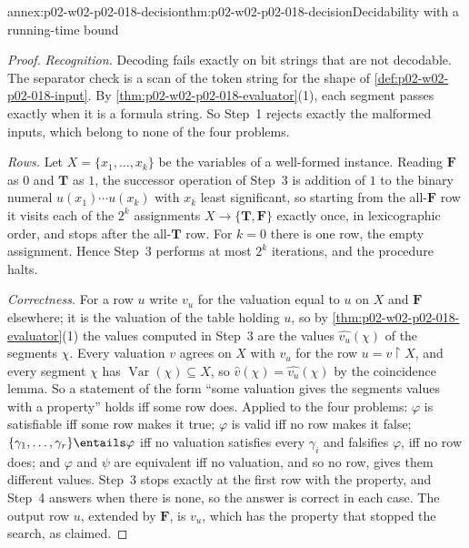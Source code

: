\begin{annexitem}{annex:p02-w02-p02-018-decision}{thm:p02-w02-p02-018-decision}{Decidability with a running-time bound}
\begin{proof}
\emph{Recognition.}  Decoding fails exactly on bit strings that are not
decodable.  The separator check is a scan of the token string for the shape of
\cref{def:p02-w02-p02-018-input}.  By
\cref{thm:p02-w02-p02-018-evaluator}(1), each segment passes exactly when it
is a formula string.  So Step~1 rejects exactly the malformed inputs, which
belong to none of the four problems.

\emph{Rows.}  Let \(X=\{x_1,\ldots,x_k\}\) be the variables of a well-formed
instance.  Reading \(\mathbf F\) as \(0\) and \(\mathbf T\) as \(1\), the
successor operation of Step~3 is addition of \(1\) to the binary numeral
\(u(x_1)\cdots u(x_k)\) with \(x_k\) least significant, so starting from the
all-\(\mathbf F\) row it visits each of the \(2^k\) assignments
\(X\to\{\mathbf T,\mathbf F\}\) exactly once, in lexicographic order, and
stops after the all-\(\mathbf T\) row.  For \(k=0\) there is one row, the
empty assignment.  Hence Step~3 performs at most \(2^k\) iterations, and the
procedure halts.

\emph{Correctness.}  For a row \(u\) write \(v_u\) for the valuation equal to
\(u\) on \(X\) and \(\mathbf F\) elsewhere; it is the valuation of the table
holding \(u\), so by \cref{thm:p02-w02-p02-018-evaluator}(1) the values
computed in Step~3 are the values \(\widehat{v_u}(\chi)\) of the segments
\(\chi\).  Every valuation \(v\) agrees on \(X\) with \(v_u\) for the row
\(u=v\mathbin{\upharpoonright}X\), and every segment \(\chi\) has
\(\operatorname{Var}(\chi)\subseteq X\), so
\(\widehat v(\chi)=\widehat{v_u}(\chi)\) by the coincidence lemma.  So a
statement of the form ``some valuation gives the segments values with a
property'' holds iff some row does.  Applied to the four problems:
\(\varphi\) is satisfiable iff some row makes it true; \(\varphi\) is valid
iff no row makes it false; \(\{\gamma_1,\ldots,\gamma_r\}\entails\varphi\)
iff no valuation satisfies every \(\gamma_i\) and falsifies \(\varphi\), iff
no row does; and \(\varphi\) and \(\psi\) are equivalent iff no valuation, and
so no row, gives them different values.  Step~3 stops exactly at the first
row with the property, and Step~4 answers when there is none, so the answer is
correct in each case.  The output row \(u\), extended by \(\mathbf F\), is
\(v_u\), which has the property that stopped the search, as claimed.


\end{proof}
\end{annexitem}
